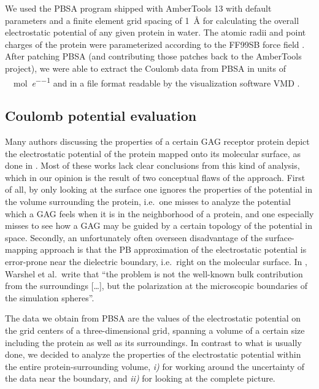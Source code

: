 We used the PBSA program shipped with AmberTools 13 \cite{case_amber_12} with
default parameters and a finite element grid spacing of \SI{1}{\angstrom} for
calculating the overall electrostatic potential of any given protein in water.
The atomic radii and point charges of the protein were parameterized according
to the FF99SB force field \cite{case_amber_12}. After patching PBSA (and
contributing those patches back to the AmberTools project), we were able to
extract the Coulomb data from PBSA in units of
\si{\kilo\calory\per\mole\per\elementarycharge} and in a file format readable by
the visualization software VMD \cite{vmd_1996}.

\subsection{Coulomb potential evaluation}

Many authors discussing the properties of a certain GAG receptor protein depict
the electrostatic potential of the protein mapped onto its molecular surface, as
done in \cite{rogers_gag_prot_prot_2011,%
Gandhi01102009,sapay_hs_growthfactors_2011,%
gandhi_bmp_heparin_binding_sites_2012,sost_heparin_2009,%
catK_cs4_crystal_structure_2008,hydrolase_gags_2011,gandhi_structure_2008,%
imberty_gag_prot_carbres_2007,gags_as_polyelectrolytes_2010}. Most of these
works lack clear conclusions from this kind of analysis, which in our opinion is
the result of two conceptual flaws of the approach. First of all, by only
looking at the surface one ignores the properties of the potential in the volume
surrounding the protein, i.e.\ one misses to analyze the potential which a GAG
feels when it is in the neighborhood of a protein, and one especially misses to
see how a GAG may be guided by a certain topology of the potential in space.
Secondly, an unfortunately often overseen disadvantage of the surface-mapping
approach is that the PB approximation of the electrostatic potential is
 error-prone near the dielectric boundary, i.e.\ right on the
molecular surface. In \cite{estatic_proteins_warshel_2006}, Warshel et al.\
write that \enquote{the problem is not the well-known bulk contribution from the
surroundings [\dots], but the polarization at the microscopic boundaries of the
simulation spheres}.

The data we obtain from PBSA are the values of the electrostatic potential on
the grid centers of a three-dimensional grid, spanning a volume of a certain
size including the protein as well as its surroundings. In contrast to what is
usually done, we decided to analyze the properties of the electrostatic
potential within the entire protein-surrounding volume, \textit{i)} for working
around the uncertainty of the data near the boundary, and \textit{ii)} for
looking at the complete picture.

